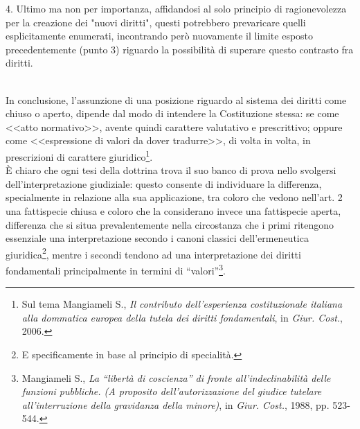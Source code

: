 4. Ultimo ma non per importanza, affidandosi al solo principio di ragionevolezza per la creazione dei "nuovi diritti", questi potrebbero prevaricare quelli esplicitamente enumerati, incontrando però nuovamente il limite esposto precedentemente (punto 3) riguardo la possibilità di superare questo contrasto fra diritti.
\begin{comment}Vicenda simile si è verificata nelle corti americane, che sebbene facenti parte di un sistema di common law che prevede l'utilizzo del precedente, ha avuto "problematiche" rispetto all'interpretazione del IX emendamento al pari di quello che nelle corti italiane si è avuto rispetto all'interpretazione dell'art. 2.
L'america si divise in due linee ermeneutiche ben distinte: la lettura ampia, che vedeva il IX emendamento come norma di produzione del diritto, e la lettura restrittiva, che considerava invece il IX emendamento come norma di interpretazione.
La prima consentiva il riconoscimento di un numero illimitato di diritti fondamentali, mentre la seconda si trovava ad essere più che altro una norma "istruzione", ossia su come leggere la costituzionale, consentendo quindi l'emersione sì di diritti impliciti nel dettato costituzionale stesso, ma limitati ad una riconducibilità diretta alla stessa.
Il fulcro sta anche in questo caso nel riconoscere il valore della certezza del diritto e la necessità di vagliaare sempre le scelte degli interpreti con i filtri apprestati dall'ordinamento nel riconoscimento di un nuovo diritto, ma bilanciandolo con l'esigenza di estendere il carattere <<fondamentale>> a nuovi interesse emergenti.\end{comment}
\\In conclusione, l’assunzione di una posizione riguardo al sistema dei diritti come chiuso o aperto, dipende dal modo di intendere la Costituzione stessa: se come <<atto normativo>>, avente quindi carattere valutativo e prescrittivo; oppure come <<espressione di valori da dover tradurre>>, di volta in volta, in prescrizioni di carattere giuridico\footnote{Sul tema Mangiameli S., \textit{Il contributo dell’esperienza costituzionale italiana alla dommatica europea della tutela dei diritti fondamentali}, in \textit{Giur. Cost.}, 2006.}.
\\È chiaro che ogni tesi della dottrina trova il suo banco di prova nello svolgersi dell’interpretazione giudiziale: questo consente di individuare la differenza, specialmente in relazione alla sua applicazione, tra coloro che vedono nell’art. 2 una fattispecie chiusa e coloro che la considerano invece una fattispecie aperta, differenza che si situa prevalentemente nella circostanza che i primi ritengono essenziale una interpretazione secondo i canoni classici dell’ermeneutica giuridica\footnote{E specificamente in base al principio di specialità.}, mentre i secondi tendono ad una interpretazione dei diritti fondamentali principalmente in termini di “valori”\footnote{Mangiameli S., \textit{La “libertà di coscienza” di fronte all’indeclinabilità delle funzioni pubbliche. (A proposito dell’autorizzazione del giudice tutelare all’interruzione della gravidanza della minore)}, in \textit{Giur. Cost.}, 1988, pp. 523-544.}.
